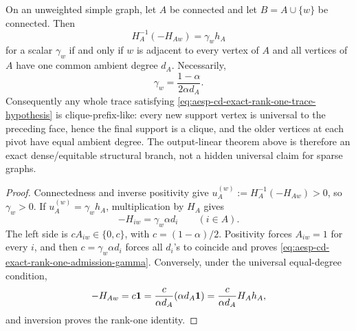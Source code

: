 \begin{proposition}
\label{prop:aesp-cd-exact-rank-one-admission-characterization}
On an unweighted simple graph, let \(A\) be connected and let
\(B=A\cup\{w\}\) be connected.  Then
\begin{equation*}
 H_A^{-1}(-H_{Aw})=\gamma_wh_A
\end{equation*}
for a scalar \(\gamma_w\) if and only if \(w\) is adjacent to every vertex of
\(A\) and all vertices of \(A\) have one common ambient degree \(d_A\).
Necessarily,
\begin{equation}
 \gamma_w=\frac{1-\alpha}{2\alpha d_A}.
 \label{eq:aesp-cd-exact-rank-one-admission-gamma}
\end{equation}
Consequently any whole trace satisfying
\cref{eq:aesp-cd-exact-rank-one-trace-hypothesis} is clique-prefix-like:
every new support vertex is universal to the preceding face, hence the final
support is a clique, and the older vertices at each pivot have equal ambient
degree.  The output-linear theorem above is therefore an exact dense/equitable
structural branch, not a hidden universal claim for sparse graphs.
\end{proposition}

\begin{proof}
Connectedness and inverse positivity give
\(u_A^{(w)}:=H_A^{-1}(-H_{Aw})>0\), so \(\gamma_w>0\).  If
\(u_A^{(w)}=\gamma_wh_A\), multiplication by \(H_A\) gives
\begin{equation*}
 -H_{iw}=\gamma_w\alpha d_i
 \qquad(i\in A).
\end{equation*}
The left side is \(cA_{iw}\in\{0,c\}\), with
\(c=(1-\alpha)/2\).  Positivity forces \(A_{iw}=1\) for every \(i\), and then
\(c=\gamma_w\alpha d_i\) forces all \(d_i\)'s to coincide and proves
\cref{eq:aesp-cd-exact-rank-one-admission-gamma}.  Conversely, under the
universal equal-degree condition,
\begin{equation*}
 -H_{Aw}=c\mathbf{1}
 =\frac{c}{\alpha d_A}(\alpha d_A\mathbf{1})
 =\frac{c}{\alpha d_A}H_Ah_A,
\end{equation*}
and inversion proves the rank-one identity.
\end{proof}

